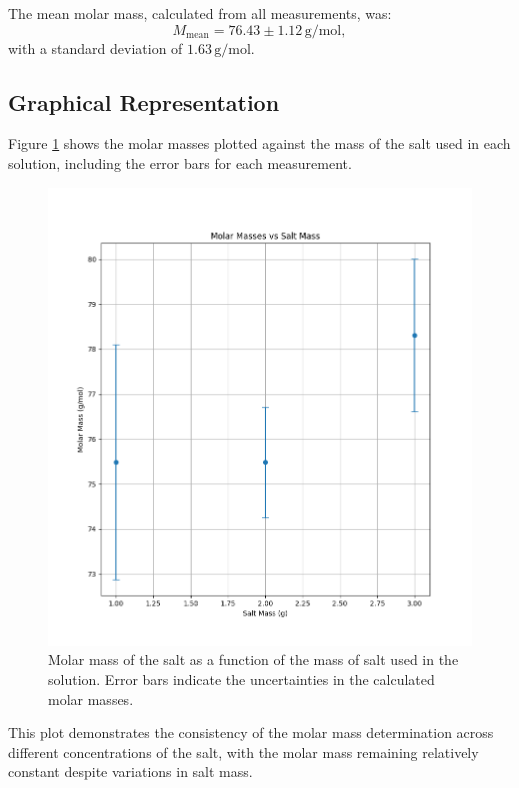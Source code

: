 \documentclass[a4paper,12pt]{article}
\begin{document}
The mean molar mass, calculated from all measurements, was:
\begin{equation}
M_{\text{mean}} = 76.43 \pm 1.12 \, \text{g/mol},
\end{equation}
with a standard deviation of $1.63 \, \text{g/mol}$.

\subsection{Graphical Representation}
Figure \ref{fig:molar_mass_plot} shows the molar masses plotted against the mass of the salt used in each solution, including the error bars for each measurement.

\begin{figure}[H]
    \centering
    \includegraphics[width=\textwidth]{images/molar_mass_by_salt_mass.png}
    \caption{Molar mass of the salt as a function of the mass of salt used in the solution. Error bars indicate the uncertainties in the calculated molar masses.}
    \label{fig:molar_mass_plot}
\end{figure}

This plot demonstrates the consistency of the molar mass determination across different concentrations of the salt, with the molar mass remaining relatively constant despite variations in salt mass.
\end{document}
